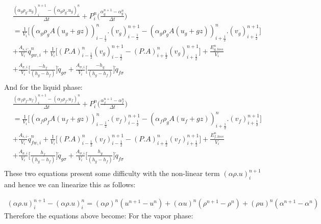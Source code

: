 \documentclass[11pt,letterpaper,titlepage]{article}
\newcommand{\half}{\frac{1}{2}}
\begin{document}
\begin{equation*}
\begin{aligned}
&\frac{(\alpha_g\rho_g.u_g)_i^{n+1}-(\alpha_g\rho_g.u_g)_i^n}{\Delta t} + P_i^n \biggr( \frac{\alpha_g^{n+1}-\alpha_g^n}{\Delta t} \biggr)\\
&=\frac{1}{V_i}\biggr[ (\alpha_g\rho_g A(u_g+gz))_{i-\half}^n.(v_g)_{i-\half}^{n+1} - (\alpha_g\rho_g A(u_g+gz))_{i+\half}^n.(v_g)_{i+\half}^{n+1} \biggr] \\
&+\frac{A_{s,i}}{V_i}\dot{q}_{gw,i}^n + \frac{1}{V_i}\biggr[   (P.A)_{i-\half}^n(v_g)_{i-\half}^{n+1} - (P.A)_{i+\half}^n(v_g)_{i+\half}^{n+1}   \biggr] + \frac{E_{g,loss}^n}{V_i}\\
&+\frac{A_{\sigma,i}}{V_i} \biggr[\frac{- h_f  }{(h_g-h_f)}  \biggr]\dot{q}_{g\sigma}
+\frac{A_{\sigma,i}}{V_i} \biggr[\frac{ - h_g }{(h_g-h_f)}  \biggr]\dot{q}_{f\sigma}\\
\end{aligned}
\end{equation*}
\newline
\noindent
And for the liquid phase:
\newline
\begin{equation*}
\begin{aligned}
&\frac{(\alpha_f\rho_f.u_f)_i^{n+1}-(\alpha_f\rho_f.u_f)_i^n}{\Delta t} + P_i^n \biggr( \frac{\alpha_f^{n+1}-\alpha_f^n}{\Delta t} \biggr)\\
&=\frac{1}{V_i}\biggr[ (\alpha_f\rho_f A(u_f+gz))_{i-\half}^n.(v_f)_{i-\half}^{n+1} - (\alpha_f\rho_g A(u_f+gz))_{i+\half}^n.(v_f)_{i+\half}^{n+1} \biggr] \\
&+\frac{A_{s,i}}{V_i}\dot{q}_{fw,i}^n + \frac{1}{V_i}\biggr[   (P.A)_{i-\half}^n(v_f)_{i-\half}^{n+1} - (P.A)_{i+\half}^n(v_f)_{i+\half}^{n+1}   \biggr] + \frac{E_{f,loss}^n}{V_i}\\
&+\frac{A_{\sigma,i}}{V_i} \biggr[\frac{ h_f  }{(h_g-h_f)}  \biggr]\dot{q}_{g\sigma}
+\frac{A_{\sigma,i}}{V_i} \biggr[\frac{ h_g }{(h_g-h_f)}  \biggr]\dot{q}_{f\sigma}\\
\end{aligned}
\end{equation*}
\newline
\noindent These two equations present some difficulty with the non-linear term $(\alpha\rho.u)_i^{n+1}$ and hence we can linearize this as follows:

\begin{equation*}
\begin{aligned}
(\alpha\rho.u)_i^{n+1}-(\alpha\rho.u)_i^{n}
=(\alpha\rho)^n (u^{n+1}-u^{n})
+(\alpha u)^n   (\rho^{n+1} - \rho^n)
+(\rho u)^n     (\alpha^{n+1}-\alpha^n)
\end{aligned}
\end{equation*}
\newline
\noindent Therefore the equations above become:
\newpage
\noindent
For the vapor phase:
\end{document}

